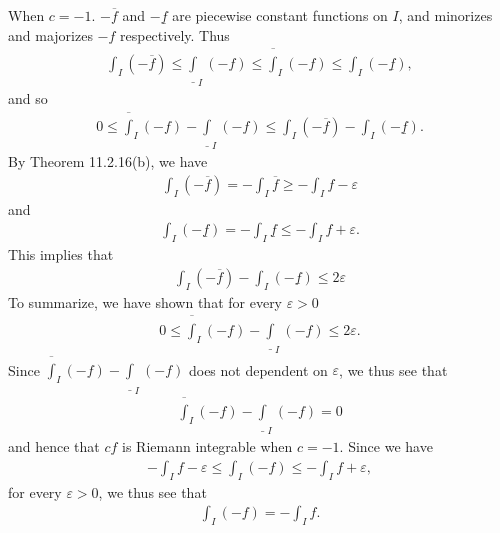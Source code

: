 \documentclass{book}
\begin{document}
\begin{enumerate}
    When $c=-1$. $-\overline f$ and $-\underline f$ are piecewise constant functions on $I$, and minorizes and majorizes $-f$ respectively. Thus
        \begin{align*}
            \int_{I}(-\overline f)\leq\underline\int_{I}(-f)\leq\overline\int_{I}(-f)\leq\int_{I}(-\underline f),
        \end{align*}
    and so
        \begin{align*}
            0\leq\overline\int_{I}(-f)-\underline\int_{I}(-f)
            \leq\int_{I}(-\overline f)-\int_{I}(-\underline f).
        \end{align*}
    By Theorem 11.2.16(b), we have
        \begin{align*}
            \int_{I}(-\overline f)=-\int_{I}\overline f\geq -\int_{I}f-\varepsilon
        \end{align*}
    and
        \begin{align*}
            \int_{I}(-\underline f)=-\int_{I}\underline f\leq -\int_{I}f+\varepsilon.
        \end{align*}
    This implies that
        \begin{align*}
            \int_{I}(-\overline f)-\int_{I}(-\underline f)\leq 2\varepsilon
        \end{align*}
    To summarize, we have shown that for every $\varepsilon>0$
        \begin{align*}
            0\leq\overline\int_{I}(-f)-\underline\int_{I}(-f)
            \leq 2\varepsilon.
        \end{align*}
    Since $\overline\int_{I}(-f)-\underline\int_{I}(-f)$ does not dependent on $\varepsilon$, we thus see that
        \begin{align*}
            \overline\int_{I}(-f)-\underline\int_{I}(-f)=0
        \end{align*}
    and hence that $cf$ is Riemann integrable when $c=-1$. Since we have
        \begin{align*}
            -\int_{I}f-\varepsilon
            \leq\int_{I}(-f)
            \leq -\int_{I}f+\varepsilon,
        \end{align*}
    for every $\varepsilon>0$, we thus see that
        \begin{align*}
            \int_{I}(-f)=-\int_{I}f.
        \end{align*}


\end{enumerate}
\end{document}
